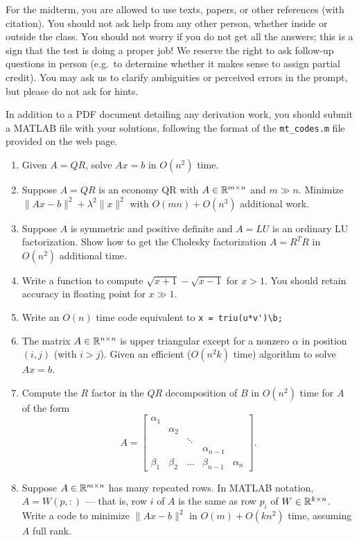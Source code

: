 \documentclass[12pt, leqno]{article}
\begin{document}

For the midterm, you are allowed to use texts, papers, or other
references (with citation).  You should not ask help from any other
person, whether inside or outside the class.  You should not worry if
you do not get all the answers; this is a sign that the test is doing
a proper job!  We reserve the right to ask follow-up questions in
person (e.g.~to determine whether it makes sense to assign partial
credit).  You may ask us to clarify ambiguities or perceived errors in
the prompt, but please do not ask for hints.

In addition to a PDF document detailing any derivation work,
you should submit a MATLAB file with your solutions, following
the format of the \verb|mt_codes.m| file provided on the web page.

\begin{enumerate}
  
\item Given $A = QR$, solve $Ax = b$ in $O(n^2)$ time.
    
\item Suppose $A = QR$ is an economy QR with $A \in \mathbb{R}^{m \times n}$
  and $m \gg n$.
  Minimize $\|Ax-b\|^2 + \lambda^2 \|x\|^2$ with
  $O(mn) + O(n^3)$ additional work.
    
\item Suppose $A$ is symmetric and positive definite and $A = LU$ is
  an ordinary LU factorization.  Show how to get the Cholesky
  factorization $A = R^T R$ in $O(n^2)$ additional time.

\item
  Write a function to compute $\sqrt{x+1}-\sqrt{x-1}$ for $x > 1$.
  You should retain accuracy in floating point for $x \gg 1$.

\item
  Write an $O(n)$ time code equivalent to \verb|x = triu(u*v')\b;|

\item
  The matrix $A \in \mathbb{R}^{n \times n}$ is upper triangular except for
  a nonzero $\alpha$ in position $(i,j)$ (with $i > j$).  Given an efficient
  ($O(n^2 k)$ time) algorithm to solve $Ax = b$.

\item
  Compute the $R$ factor in the $QR$
  decomposition of $B$ in $O(n^2)$ time for $A$ of the form
  \[
  A = \begin{bmatrix}
    \alpha_1 \\
    & \alpha_2  \\
    & & \ddots \\
    & & & \alpha_{n-1} &  \\
    \beta_1 & \beta_2 & \ldots & \beta_{n-1} & \alpha_n
  \end{bmatrix}.
  \]

\item
  Suppose $A \in \mathbb{R}^{m \times n}$ has many repeated rows.  In MATLAB
  notation, $A = W(p,:)$ --- that is, row $i$ of $A$ is the same as
  row $p_i$ of $W \in \mathbb{R}^{k \times n}$.  Write a code to minimize
  $\|Ax-b\|^2$ in $O(m) + O(k n^2)$ time, assuming $A$ full rank.
  
\end{enumerate}
\end{document}
